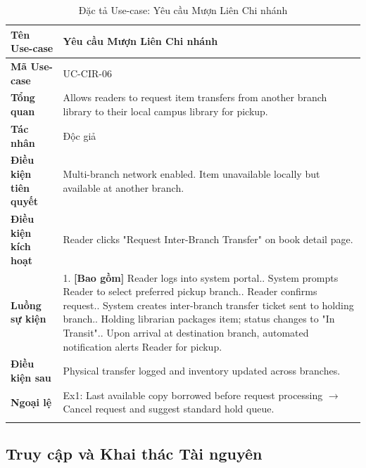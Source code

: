 \newpage
\begin{longtable}{|p{3.5cm}|p{11.5cm}|}
    \hline
    \textbf{Tên Use-case} & \textbf{Yêu cầu Mượn Liên Chi nhánh} \\
    \hline
    \textbf{Mã Use-case} & UC-CIR-06 \\
    \hline
    \textbf{Tổng quan} & Allows readers to request item transfers from another branch library to their local campus library for pickup. \\
    \hline
    \textbf{Tác nhân} & Độc giả \\
    \hline
    \textbf{Điều kiện tiên quyết} & Multi-branch network enabled. Item unavailable locally but available at another branch. \\
    \hline
    \textbf{Điều kiện kích hoạt} & Reader clicks "Request Inter-Branch Transfer" on book detail page. \\
    \hline
    \textbf{Luồng sự kiện} & 
    1. \textbf{[Bao gồm]} Reader logs into system portal.\newline
    2. System prompts Reader to select preferred pickup branch.\newline
    3. Reader confirms request.\newline
    4. System creates inter-branch transfer ticket sent to holding branch.\newline
    5. Holding librarian packages item; status changes to "In Transit".\newline
    6. Upon arrival at destination branch, automated notification alerts Reader for pickup. \\
    \hline
    \textbf{Điều kiện sau} & Physical transfer logged and inventory updated across branches. \\
    \hline
    \textbf{Ngoại lệ} & 
    Ex1: Last available copy borrowed before request processing $\rightarrow$ Cancel request and suggest standard hold queue. \\
    \hline
    \caption{Đặc tả Use-case: Yêu cầu Mượn Liên Chi nhánh}
\end{longtable}

\subsection{Truy cập và Khai thác Tài nguyên}

